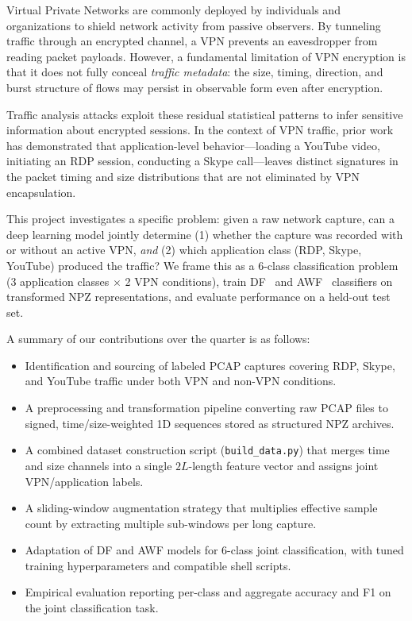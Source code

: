 \documentclass[letterpaper,twocolumn,10pt]{article}
\begin{document}
Virtual Private Networks are commonly deployed by individuals and organizations to shield network activity from passive observers. By tunneling traffic through an encrypted channel, a VPN prevents an eavesdropper from reading packet payloads. However, a fundamental limitation of VPN encryption is that it does not fully conceal \emph{traffic metadata}: the size, timing, direction, and burst structure of flows may persist in observable form even after encryption.

Traffic analysis attacks exploit these residual statistical patterns to infer sensitive information about encrypted sessions. In the context of VPN traffic, prior work has demonstrated that application-level behavior---loading a YouTube video, initiating an RDP session, conducting a Skype call---leaves distinct signatures in the packet timing and size distributions that are not eliminated by VPN encapsulation.

This project investigates a specific problem: given a raw network capture, can a deep learning model jointly determine (1) whether the capture was recorded with or without an active VPN, \emph{and} (2) which application class (RDP, Skype, YouTube) produced the traffic? We frame this as a 6-class classification problem (3 application classes $\times$ 2 VPN conditions), train DF~\cite{df} and AWF~\cite{awf} classifiers on transformed NPZ representations, and evaluate performance on a held-out test set.

A summary of our contributions over the quarter is as follows:
\begin{itemize}[topsep=0pt, leftmargin=1.2em]
  \item Identification and sourcing of labeled PCAP captures covering RDP, Skype, and YouTube traffic under both VPN and non-VPN conditions.
  \item A preprocessing and transformation pipeline converting raw PCAP files to signed, time/size-weighted 1D sequences stored as structured NPZ archives.
  \item A combined dataset construction script (\texttt{build\_data.py}) that merges time and size channels into a single $2L$-length feature vector and assigns joint VPN/application labels.
  \item A sliding-window augmentation strategy that multiplies effective sample count by extracting multiple sub-windows per long capture.
  \item Adaptation of DF and AWF models for 6-class joint classification, with tuned training hyperparameters and compatible shell scripts.
  \item Empirical evaluation reporting per-class and aggregate accuracy and F1 on the joint classification task.
\end{itemize}
\end{document}
